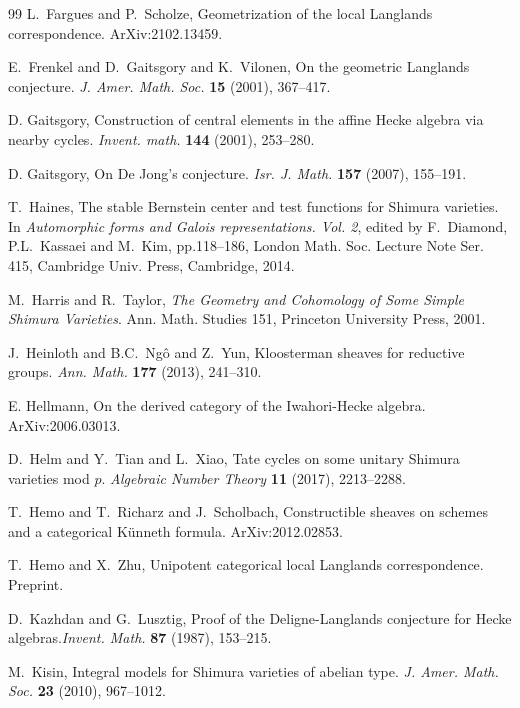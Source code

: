\begin{thebibliography}{99}
L.~Fargues and P.~Scholze, Geometrization of the local Langlands correspondence. ArXiv:2102.13459.

E.~Frenkel and D.~Gaitsgory and K.~Vilonen, On the geometric Langlands conjecture. \emph{J. Amer. Math. Soc.} \textbf{15} (2001), 367--417.

D. Gaitsgory, Construction of central elements in the affine Hecke algebra via nearby cycles. \emph{Invent. math.} \textbf{144} (2001), 253--280.

D. Gaitsgory, On De Jong's conjecture. \emph{Isr. J. Math.} \textbf{157} (2007), 155--191.

T.~Haines, The stable Bernstein center and test functions for Shimura varieties. In \emph{Automorphic forms and Galois representations. Vol. 2}, edited by
F.~Diamond, P.L.~Kassaei and M.~Kim, pp.118--186, London Math. Soc. Lecture Note Ser. 415, Cambridge Univ. Press, Cambridge, 2014.

M.~Harris and R.~Taylor, \emph{The Geometry and Cohomology of Some Simple Shimura Varieties}.  Ann. Math. Studies 151, Princeton University Press, 2001.

J.~Heinloth and B.C.~Ng\^o and Z.~Yun, Kloosterman sheaves for reductive groups. \emph{Ann. Math.} \textbf{177} (2013), 241--310.

E. Hellmann, On the derived category of the Iwahori-Hecke algebra. ArXiv:2006.03013.

D.~Helm and Y.~Tian and L.~Xiao, Tate cycles on some unitary Shimura varieties mod $p$. \emph{Algebraic Number Theory} \textbf{11} (2017), 2213--2288.

T.~Hemo and T.~Richarz and J.~Scholbach, Constructible sheaves on schemes and a categorical K\"unneth formula. ArXiv:2012.02853.

T.~Hemo and X.~Zhu, Unipotent categorical local Langlands correspondence. Preprint.

D.~Kazhdan and G.~Lusztig, Proof of the Deligne-Langlands conjecture for Hecke algebras.\emph{Invent. Math.} \textbf{87} (1987), 153--215.

M.~Kisin, Integral models for Shimura varieties of abelian type. \emph{J. Amer. Math. Soc.} \textbf{23} (2010), 967--1012.


\end{thebibliography}
